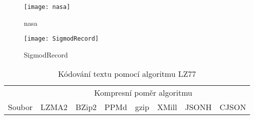 \begin{figure}[!h]
\centering
\texttt{[image: nasa]}
\caption{nasa}
\label{nasa}
\end{figure}

\begin{figure}[!h]
\centering
\texttt{[image: SigmodRecord]}
\caption{SigmodRecord}
\label{SigmodRecord}
\end{figure}

\begin{table}[!htb]
\centering
\begin{tabular}{|l|r|r|r|r|r|r|r|}
\hline
 & \multicolumn{7}{|c|}{Kompresní poměr algoritmu}\\
 \cline{2-7}
 Soubor & LZMA2 & BZip2 & PPMd & gzip & XMill & JSONH & CJSON\\
\hline
\end{tabular}
\caption{Kódování textu pomocí algoritmu LZ77}
\label{tabulkaKompresniPomer}
\end{table}